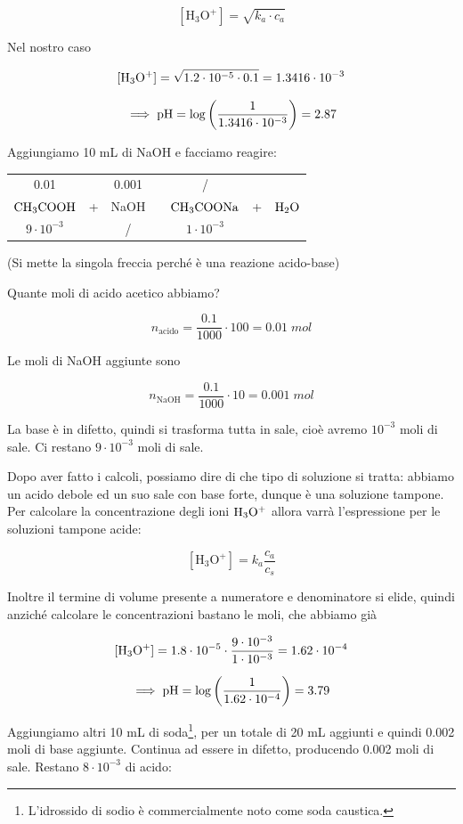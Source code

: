 $$[\text{H}_3\text{O}^+]=\sqrt{k_a \cdot c_a}$$

Nel nostro caso

$$\rm [H_3O^+]=\sqrt{1.2 \cdot 10^{-5} \cdot 0.1}=1.3416 \cdot 10^{-3}$$

$$\implies \rm pH=\log{\left(\frac{1}{1.3416 \cdot 10^{-3}}\right)}=2.87$$

Aggiungiamo 10 mL di NaOH e facciamo reagire:

\begin{center}
    \begin{tabular}{ccccccc}
        0.01 &  & 0.001  & & / & &\\
        $\rm CH_3COOH$ & + & NaOH & \ce{->} & $\rm CH_3COONa$ & + & $\rm H_2O$\\
        $9 \cdot 10^{-3}$ &  &  / & & $1 \cdot 10^{-3}$ & &\\
    \end{tabular}
\end{center}

(Si mette la singola freccia perché è una reazione acido-base)

Quante moli di acido acetico abbiamo?

$$n_{\text{acido}}=\frac{0.1}{1000}\cdot 100 = 0.01 \; mol$$

Le moli di NaOH aggiunte sono

$$n_{\text{NaOH}}=\frac{0.1}{1000}\cdot 10 = 0.001 \; mol$$

La base è in difetto, quindi si trasforma tutta in sale, cioè avremo $10^{-3}$ moli di sale. Ci restano $9 \cdot 10^{-3}$ moli di sale.

Dopo aver fatto i calcoli, possiamo dire di che tipo di soluzione si tratta: abbiamo un acido debole ed un suo sale con base forte, dunque è una soluzione tampone. Per calcolare la concentrazione degli ioni $\rm H_3O^+$ allora varrà l'espressione per le soluzioni tampone acide:

$$[\text{H}_3\text{O}^+] = k_a \frac{c_a}{c_s}$$

Inoltre il termine di volume presente a numeratore e denominatore si elide, quindi anziché calcolare le concentrazioni bastano le moli, che abbiamo già

$$\rm [H_3O^+]=1.8 \cdot 10^{-5} \cdot \frac{9 \cdot 10^{-3}}{1 \cdot 10^{-3}}=1.62 \cdot 10^{-4}$$

$$\implies \rm pH=\log\left(\frac{1}{1.62 \cdot 10^{-4}}\right)=3.79$$

Aggiungiamo altri 10 mL di soda\footnote{L'idrossido di sodio è commercialmente noto come soda caustica.}, per un totale di 20 mL aggiunti e quindi 0.002 moli di base aggiunte. Continua ad essere in difetto, producendo 0.002 moli di sale. Restano $8 \cdot 10^{-3}$ di acido:

